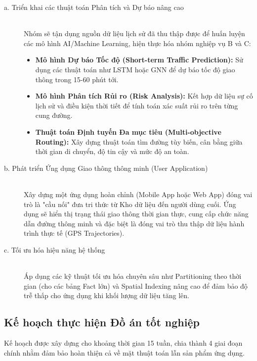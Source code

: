 \begin{description}
    \item[a. Triển khai các thuật toán Phân tích và Dự báo nâng cao] \hfill \\
    Nhóm sẽ tận dụng nguồn dữ liệu lịch sử đã thu thập được để huấn luyện các mô hình AI/Machine Learning, hiện thực hóa nhóm nghiệp vụ B và C:
    \begin{itemize}
        \item \textbf{Mô hình Dự báo Tốc độ (Short-term Traffic Prediction):} Sử dụng các thuật toán như LSTM hoặc GNN để dự báo tốc độ giao thông trong 15-60 phút tới.
        \item \textbf{Mô hình Phân tích Rủi ro (Risk Analysis):} Kết hợp dữ liệu sự cố lịch sử và điều kiện thời tiết để tính toán xác suất rủi ro trên từng cung đường.
        \item \textbf{Thuật toán Định tuyến Đa mục tiêu (Multi-objective Routing):} Xây dựng thuật toán tìm đường tùy biến, cân bằng giữa thời gian di chuyển, độ tin cậy và mức độ an toàn.
    \end{itemize}
    
    \item[b. Phát triển Ứng dụng Giao thông thông minh (User Application)] \hfill \\
    Xây dựng một ứng dụng hoàn chỉnh (Mobile App hoặc Web App) đóng vai trò là "cầu nối" đưa tri thức từ Kho dữ liệu đến người dùng cuối. Ứng dụng sẽ hiển thị trạng thái giao thông thời gian thực, cung cấp chức năng dẫn đường thông minh và đặc biệt là đóng vai trò thu thập dữ liệu hành trình thực tế (GPS Trajectories).
    
    \item[c. Tối ưu hóa hiệu năng hệ thống] \hfill \\
    Áp dụng các kỹ thuật tối ưu hóa chuyên sâu như Partitioning theo thời gian (cho các bảng Fact lớn) và Spatial Indexing nâng cao để đảm bảo độ trễ thấp cho ứng dụng khi khối lượng dữ liệu tăng lên.
\end{description}

\subsection{Kế hoạch thực hiện Đồ án tốt nghiệp}
Kế hoạch được xây dựng cho khoảng thời gian 15 tuần, chia thành 4 giai đoạn chính nhằm đảm bảo hoàn thiện cả về mặt thuật toán lẫn sản phẩm ứng dụng.

